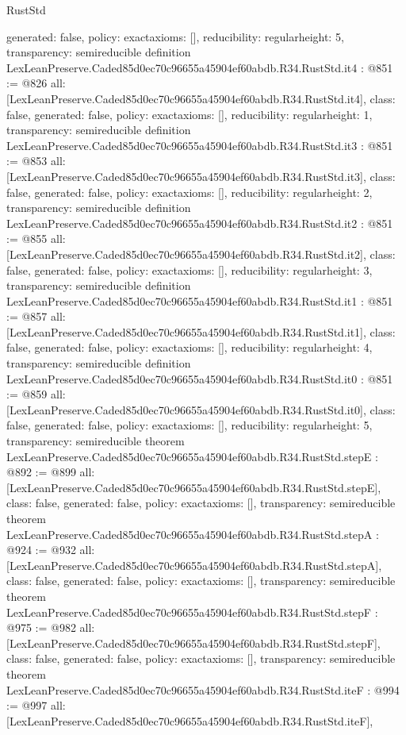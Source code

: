 \begin{lexlean}{RustStd}
\begin{coremodule}
{  generated: false,
  policy: exact{axioms: []},
  reducibility: regular{height: 5},
  transparency: semireducible
}
definition LexLeanPreserve.Caded85d0ec70c96655a45904ef60abdb.R34.RustStd.it4 : @851 := @826 {
  all: [LexLeanPreserve.Caded85d0ec70c96655a45904ef60abdb.R34.RustStd.it4],
  class: false,
  generated: false,
  policy: exact{axioms: []},
  reducibility: regular{height: 1},
  transparency: semireducible
}
definition LexLeanPreserve.Caded85d0ec70c96655a45904ef60abdb.R34.RustStd.it3 : @851 := @853 {
  all: [LexLeanPreserve.Caded85d0ec70c96655a45904ef60abdb.R34.RustStd.it3],
  class: false,
  generated: false,
  policy: exact{axioms: []},
  reducibility: regular{height: 2},
  transparency: semireducible
}
definition LexLeanPreserve.Caded85d0ec70c96655a45904ef60abdb.R34.RustStd.it2 : @851 := @855 {
  all: [LexLeanPreserve.Caded85d0ec70c96655a45904ef60abdb.R34.RustStd.it2],
  class: false,
  generated: false,
  policy: exact{axioms: []},
  reducibility: regular{height: 3},
  transparency: semireducible
}
definition LexLeanPreserve.Caded85d0ec70c96655a45904ef60abdb.R34.RustStd.it1 : @851 := @857 {
  all: [LexLeanPreserve.Caded85d0ec70c96655a45904ef60abdb.R34.RustStd.it1],
  class: false,
  generated: false,
  policy: exact{axioms: []},
  reducibility: regular{height: 4},
  transparency: semireducible
}
definition LexLeanPreserve.Caded85d0ec70c96655a45904ef60abdb.R34.RustStd.it0 : @851 := @859 {
  all: [LexLeanPreserve.Caded85d0ec70c96655a45904ef60abdb.R34.RustStd.it0],
  class: false,
  generated: false,
  policy: exact{axioms: []},
  reducibility: regular{height: 5},
  transparency: semireducible
}
theorem LexLeanPreserve.Caded85d0ec70c96655a45904ef60abdb.R34.RustStd.stepE : @892 := @899 {
  all: [LexLeanPreserve.Caded85d0ec70c96655a45904ef60abdb.R34.RustStd.stepE],
  class: false,
  generated: false,
  policy: exact{axioms: []},
  transparency: semireducible
}
theorem LexLeanPreserve.Caded85d0ec70c96655a45904ef60abdb.R34.RustStd.stepA : @924 := @932 {
  all: [LexLeanPreserve.Caded85d0ec70c96655a45904ef60abdb.R34.RustStd.stepA],
  class: false,
  generated: false,
  policy: exact{axioms: []},
  transparency: semireducible
}
theorem LexLeanPreserve.Caded85d0ec70c96655a45904ef60abdb.R34.RustStd.stepF : @975 := @982 {
  all: [LexLeanPreserve.Caded85d0ec70c96655a45904ef60abdb.R34.RustStd.stepF],
  class: false,
  generated: false,
  policy: exact{axioms: []},
  transparency: semireducible
}
theorem LexLeanPreserve.Caded85d0ec70c96655a45904ef60abdb.R34.RustStd.iteF : @994 := @997 {
  all: [LexLeanPreserve.Caded85d0ec70c96655a45904ef60abdb.R34.RustStd.iteF],
}
\end{coremodule}
\end{lexlean}
